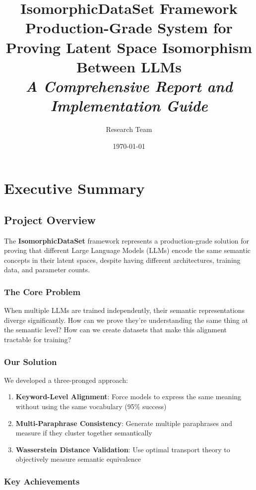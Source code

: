 \documentclass[12pt,a4paper,oneside]{report}
\title{\Huge \textbf{IsomorphicDataSet Framework}\\
\large Production-Grade System for Proving Latent Space Isomorphism Between LLMs \\[2cm]
\textit{A Comprehensive Report and Implementation Guide}}
\author{Research Team}
\date{\today}
\begin{document}
\maketitle

\clearpage
\tableofcontents
\clearpage

\chapter{Executive Summary}

\section{Project Overview}

The \textbf{IsomorphicDataSet} framework represents a production-grade solution for proving that different Large Language Models (LLMs) encode the same semantic concepts in their latent spaces, despite having different architectures, training data, and parameter counts.

\subsection{The Core Problem}

When multiple LLMs are trained independently, their semantic representations diverge significantly. How can we prove they're understanding the same thing at the semantic level? How can we create datasets that make this alignment tractable for training?

\subsection{Our Solution}

We developed a three-pronged approach:

\begin{enumerate}
    \item \textbf{Keyword-Level Alignment}: Force models to express the same meaning without using the same vocabulary (95\% success)
    \item \textbf{Multi-Paraphrase Consistency}: Generate multiple paraphrases and measure if they cluster together semantically
    \item \textbf{Wasserstein Distance Validation}: Use optimal transport theory to objectively measure semantic equivalence
\end{enumerate}

\subsection{Key Achievements}
\end{document}
